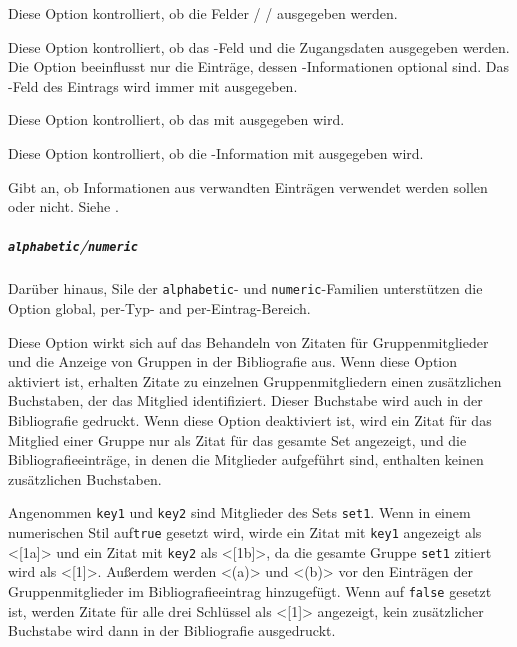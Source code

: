 \documentclass{ltxdockit}[2011/03/25]
\begin{document}
\begin{optionlist}


Diese Option kontrolliert, ob die Felder \slash
{}\slash {} ausgegeben werden.


Diese Option kontrolliert, ob das -Feld und die Zugangsdaten
ausgegeben werden. Die Option beeinflusst nur die Einträge, dessen
-Informationen optional sind. Das -Feld des
 Eintrags wird immer mit ausgegeben.

 Diese Option kontrolliert, ob das  mit
ausgegeben wird.

 Diese Option kontrolliert, ob die
-Information mit ausgegeben wird.


Gibt an, ob Informationen aus verwandten Einträgen verwendet werden sollen oder nicht. Siehe .


\end{optionlist}

\subparagraph{\texttt{alphabetic}/\texttt{numeric}} Darüber hinaus,
Sile der \texttt{alphabetic}- und \texttt{numeric}-Familien unterstützen die Option  global, per-Typ- and per-Eintrag-Bereich.

\begin{optionlist}


Diese Option wirkt sich auf das Behandeln von Zitaten für Gruppenmitglieder
und die Anzeige von Gruppen in der Bibliografie aus. Wenn diese Option aktiviert
ist, erhalten Zitate zu einzelnen Gruppenmitgliedern einen zusätzlichen Buchstaben,
der das Mitglied identifiziert. Dieser Buchstabe wird auch in der Bibliografie gedruckt. Wenn diese Option deaktiviert ist, wird ein Zitat für das Mitglied 
einer Gruppe nur als Zitat für das gesamte Set angezeigt, und die Bibliografieeinträge, in denen die Mitglieder aufgeführt sind, enthalten keinen zusätzlichen Buchstaben. 

Angenommen \texttt{key1} und \texttt{key2} sind Mitglieder des Sets 
\texttt{set1}. Wenn  in einem numerischen Stil auf\texttt{true}
gesetzt wird, wirde ein Zitat mit \texttt{key1} angezeigt als <[1a]> und ein
Zitat mit \texttt{key2} als <[1b]>, da die gesamte Gruppe \texttt{set1} zitiert
wird als <[1]>. Außerdem werden <(a)> und <(b)> vor den Einträgen der Gruppenmitglieder im Bibliografieeintrag hinzugefügt. Wenn 
auf \texttt{false} gesetzt ist, werden Zitate für alle drei Schlüssel als 
<[1]> angezeigt, kein zusätzlicher Buchstabe wird dann in der Bibliografie ausgedruckt.

\end{optionlist}
\end{document}
